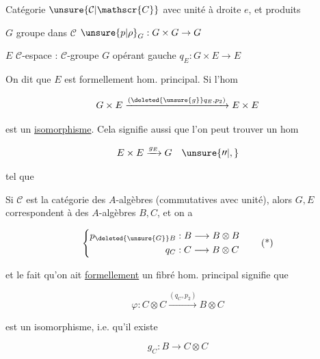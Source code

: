 

Catégorie $\unsure{\mathcal{C}|\mathscr{C}}$ avec unité à droite $e$, et produits

$G$ groupe dans $\mathcal{C}$ \qquad $\unsure{p|\rho}_G:G\times G\to G$

$E$ $\mathcal{C}$-espace : $\mathcal{C}$-groupe $G$ opérant  gauche \qquad $q_E:G\times E\to E$

On dit que $E$ est formellement hom. principal. Si l'hom

\[
G\times E\xrightarrow{(\deleted{\unsure{g}}q_E,p_2)}E\times E
\]



est un \uline{isomorphisme}. Cela signifie aussi que l'on peut trouver un hom

\[
E\times E\xrightarrow{g_E}G\quad\unsure{\prime\prime|,}
\]

tel que



Si $\mathcal{C}$ est la catégorie des $A$-algèbres (commutatives avec unité), alors $G,E$ correspondent à des $A$-algèbres  $B,C$, et on a

\[
\left\{\begin{aligned}
p_{\deleted{\unsure{G}}B}&:B\longrightarrow B\otimes B\\
q_C&:C\longrightarrow B\otimes C
\end{aligned}\right.\tag*{(*)}
\]

et le fait qu'on ait \uline{formellement} un fibré hom. principal signifie que

\[
\varphi:C\otimes C\xrightarrow{(q_C,p_2)}B\otimes C
\]

est un isomorphisme, i.e. qu'il existe

\[
g_C:B\longrightarrow C\otimes C
\]

